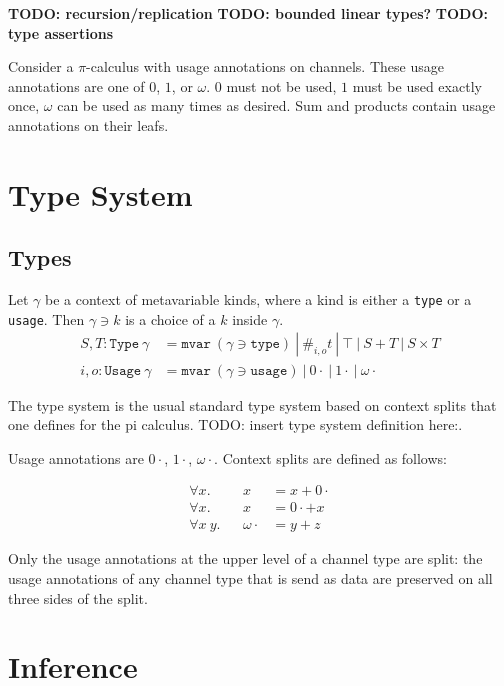 \documentclass[sigplan,screen,review]{acmart}
\begin{document}
\textbf{TODO: recursion/replication} \textbf{TODO: bounded linear
types?} \textbf{TODO: type assertions}

Consider a \(\pi\)-calculus with usage annotations on channels. These
usage annotations are one of \(0\), \(1\), or \(\omega\). \(0\) must not
be used, \(1\) must be used exactly once, \(\omega\) can be used as many
times as desired. Sum and products contain usage annotations on their
leafs.

\section{Type System}\label{type-system}


\subsection{Types}\label{types}

Let \(\gamma\) be a context of metavariable kinds, where a kind is
either a \texttt{type} or a \texttt{usage}. Then \(\gamma \ni k\) is a
choice of a \(k\) inside \(\gamma\). \[
\begin{aligned}
S, T : \texttt{Type}~\gamma &= \texttt{mvar}~(\gamma \ni \texttt{type}) ~|~ \#_{i,o}t ~|~ \top ~|~ S + T ~|~ S \times T \\
i,o : \texttt{Usage}~\gamma &= \texttt{mvar}~(\gamma \ni \texttt{usage}) ~|~ 0\cdot ~|~ 1\cdot ~|~ \omega\cdot
\end{aligned}
\]

The type system is the usual standard type system based on context
splits that one defines for the pi calculus. TODO: insert type system
definition here:.

Usage annotations are \(0\cdot\), \(1\cdot\), \(\omega\cdot\). Context
splits are defined as follows:

\[
\begin{aligned}
\forall x.    && x           &= x + 0\cdot \\
\forall x.    && x           &= 0\cdot + x \\
\forall x ~y. && \omega\cdot &= y + z
\end{aligned}
\]

Only the usage annotations at the upper level of a channel type are
split: the usage annotations of any channel type that is send as data
are preserved on all three sides of the split.

\hypertarget{inference}{%
\section{Inference}\label{inference}}
\end{document}

